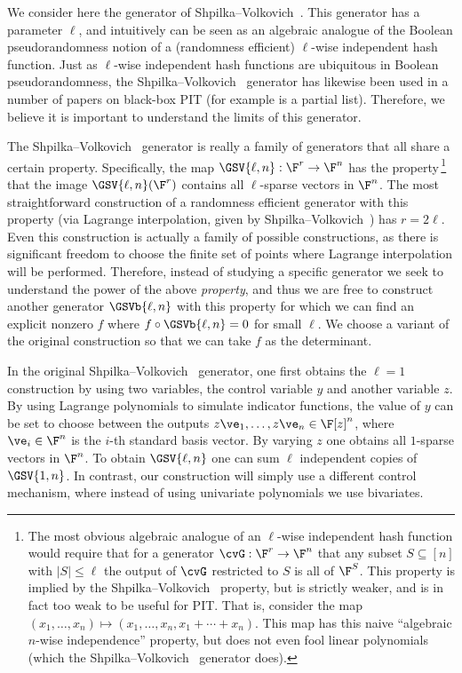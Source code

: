 \documentclass[11pt]{article}
\numberwithin{equation}{section}
\theoremstyle{definition}
\theoremstyle{plain}
\begin{document}
We consider here the generator of Shpilka--Volkovich~\cite{ShpilkaVolkovich09}. This generator has a parameter $\ell$, and intuitively can be seen as an algebraic analogue of the Boolean pseudorandomness notion of a (randomness efficient) $\ell$-wise independent hash function.  Just as $\ell$-wise independent hash functions are ubiquitous in Boolean pseudorandomness, the Shpilka--Volkovich~\cite{ShpilkaVolkovich09} generator has likewise been used in a number of papers on black-box PIT (for example \cite{ShpilkaVolkovich09,AndersonvMV11,ForbesShpilka13a,ForbesSS14,Volkovich15,Forbes15} is a partial list).
Therefore,  %
we believe it is important to understand the limits of this generator.

%

The Shpilka--Volkovich~\cite{ShpilkaVolkovich09} generator is really a family of generators that all share a certain property. Specifically, the map $\GSV{\ell,n}:\F^{r}\to\F^n$ has the property\,\footnote{The most obvious algebraic analogue of an $\ell$-wise independent hash function would require that for a generator $\cvG:\F^r\to\F^n$ that any subset $S\subseteq[n]$ with $|S|\le \ell$ the output of $\cvG$ restricted to $S$ is all of $\F^{S}$.  This property is implied by the Shpilka--Volkovich~\cite{ShpilkaVolkovich09} property, but is strictly weaker, and is in fact too weak to be useful for PIT\@.  That is, consider the map $(x_1,\ldots,x_n)\mapsto (x_1,\ldots,x_n,x_1+\cdots+x_n)$.  This map has this naive ``algebraic $n$-wise independence'' property, but does not even fool linear polynomials (which the Shpilka--Volkovich~\cite{ShpilkaVolkovich09} generator does).} that the image $\GSV{\ell,n}(\F^r)$ contains all $\ell$-sparse vectors in $\F^n$.  The most straightforward construction  of a randomness efficient generator with this property (via Lagrange interpolation, given by Shpilka--Volkovich~\cite{ShpilkaVolkovich09}) has $r=2\ell$.  Even this construction is actually a family of possible constructions, as there is significant freedom to choose the finite set of points where Lagrange interpolation will be performed.  Therefore,  %
instead of studying a specific generator we seek to understand the power of the above \emph{property}, and thus we are free to construct another generator $\GSVb{\ell,n}$ with this property for which we can find an explicit nonzero $f$ where $f\circ \GSVb{\ell,n}=0$ for small $\ell$. We choose a variant of the original construction so that we can take $f$ as the determinant.

In the original Shpilka--Volkovich~\cite{ShpilkaVolkovich09} generator, one first obtains the $\ell=1$ construction by using two variables, the control variable $y$ and another variable $z$.  By using Lagrange polynomials to simulate indicator functions, the value of $y$ can be set to choose between the outputs $z\ve_1,\ldots,z\ve_n\in\F[z]^n$, where $\ve_i\in\F^n$ is the $i$-th standard basis vector.  By varying $z$ one obtains all $1$-sparse vectors in $\F^n$.  To obtain $\GSV{\ell,n}$ one can sum $\ell$ independent copies of $\GSV{1,n}$.  In contrast, our construction will simply use a different control mechanism, where instead of using univariate polynomials we use bivariates.
\end{document}
